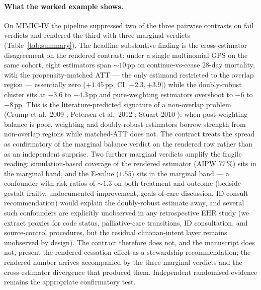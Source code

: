 \documentclass[11pt,a4paper]{article}
\begin{document}
\paragraph{What the worked example shows.} On MIMIC-IV the pipeline suppressed two of the three pairwise contrasts on fail verdicts and rendered the third with three marginal verdicts (Table~\ref{tab:summary}). The headline substantive finding is the cross-estimator disagreement on the rendered contrast: under a single multinomial GPS on the same cohort, eight estimators span $\sim 10$\,pp on continue-vs-cease 28-day mortality, with the propensity-matched ATT --- the only estimand restricted to the overlap region --- essentially zero ($+1.45$\,pp, CI [$-2.3, +3.9$]) while the doubly-robust cluster sits at $-3.6$ to $-4.3$\,pp and pure-weighting estimators overshoot to $-6$ to $-8$\,pp. This is the literature-predicted signature of a non-overlap problem (Crump et al.\ 2009 \cite{crump2009dealing}; Petersen et al.\ 2012 \cite{petersen2012positivity}; Stuart 2010 \cite{stuart2010matching}): when post-weighting balance is poor, weighting and doubly-robust estimators borrow strength from non-overlap regions while matched-ATT does not. The contract treats the spread as confirmatory of the marginal balance verdict on the rendered row rather than as an independent surprise. Two further marginal verdicts amplify the fragile reading: simulation-based coverage of the rendered estimator (AIPW $77\,\%$) sits in the marginal band, and the E-value ($1.55$) sits in the marginal band --- a confounder with risk ratios of $\sim 1.3$ on both treatment and outcome (bedside-gestalt frailty, undocumented improvement, goals-of-care discussion, ID-consult recommendation) would explain the doubly-robust estimate away, and several such confounders are explicitly unobserved in any retrospective EHR study (we extract proxies for code status, palliative-care transitions, ID consultation, and source-control procedures, but the residual clinician-intent layer remains unobserved by design). The contract therefore does not, and the manuscript does not, present the rendered cessation effect as a stewardship recommendation; the rendered number arrives accompanied by the three marginal verdicts and the cross-estimator divergence that produced them. Independent randomised evidence remains the appropriate confirmatory test.
\end{document}
